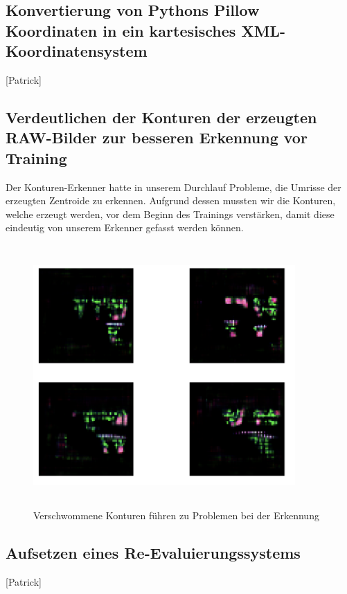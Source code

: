 \subsection{Konvertierung von Pythons Pillow Koordinaten in ein kartesisches XML-Koordinatensystem}
[Patrick]
\subsection{Verdeutlichen der Konturen der erzeugten RAW-Bilder zur besseren Erkennung vor Training}
Der Konturen-Erkenner hatte in unserem Durchlauf Probleme, die Umrisse der erzeugten Zentroide zu erkennen. Aufgrund dessen mussten wir die Konturen, welche erzeugt werden, vor dem Beginn des Trainings verstärken, damit diese eindeutig von unserem Erkenner gefasst werden können. \\
\begin{figure}
	\centering
	\includegraphics[height=10cm, width=10cm]{img/blurry_attempts.png}
	\caption{Verschwommene Konturen führen zu Problemen bei der Erkennung}
\end{figure}
\subsection{Aufsetzen eines Re-Evaluierungssystems}
[Patrick]